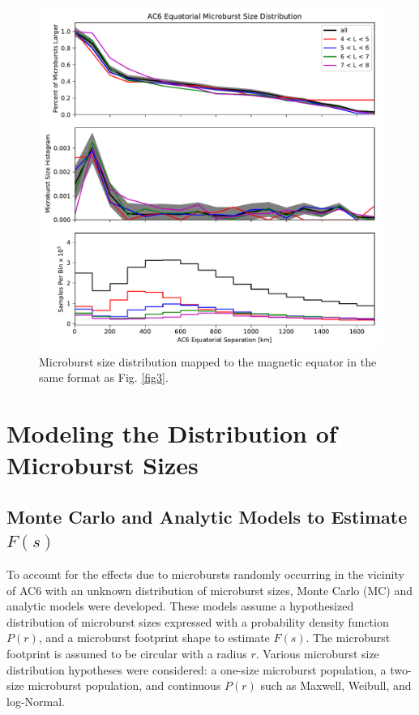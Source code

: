 \documentclass[draft]{agujournal2019}
\begin{document}
\begin{figure}
\includegraphics[width=\textwidth]{fig4.pdf}
\caption{Microburst size distribution mapped to the magnetic equator in the same format as Fig. \ref{fig3}.} 
\label{fig4}
\end{figure}

\section{Modeling the Distribution of Microburst Sizes} \label{model_section}
\subsection{Monte Carlo and Analytic Models to Estimate $F(s)$}
To account for the effects due to microbursts randomly occurring in the vicinity of AC6 with an unknown distribution of microburst sizes, Monte Carlo (MC) and analytic models were developed. These models assume a hypothesized distribution of microburst sizes expressed with a probability density function $P(r)$, and a microburst footprint shape to estimate $F(s)$. The microburst footprint is assumed to be circular with a radius $r$. Various microburst size distribution hypotheses were considered: a one-size microburst population, a two-size microburst population, and continuous $P(r)$ such as Maxwell, Weibull, and log-Normal.
\end{document}
